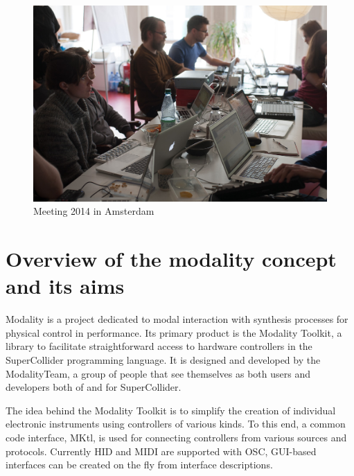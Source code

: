 \documentclass{article}
\title{\papertitle}
\begin{document}
%
\capstartfalse
\maketitle
\capstarttrue
%
\begin{abstract}
	Modality is a toolkit to improve and facilitate the use of digital technology within sound art and music, based on the audio programming language SuperCollider.
\end{abstract}

\begin{figure}[h]
	\centering
		\includegraphics[width=.9\columnwidth]{../media/20140331-IMG_5976.jpg}
	\caption{Meeting 2014 in Amsterdam}
	\label{fig:media_20140331-IMG_5976}
\end{figure}

\section{Overview of the modality concept and its aims}
\label{sec:overview_of_modality_concept_and_aims}


Modality is a project dedicated to modal interaction with synthesis processes for physical control in performance. Its primary product is the Modality Toolkit, a library to facilitate straightforward access to hardware controllers in the SuperCollider programming language. It is designed and developed by the ModalityTeam, a group of people that see themselves as both users and developers both of and for SuperCollider.

The idea behind the Modality Toolkit is to simplify the creation of individual electronic instruments using controllers of various kinds. 
To this end, a common code interface, MKtl, is used for connecting controllers from various sources and protocols. 
Currently HID and MIDI are supported with OSC, GUI-based interfaces can be created on the fly from interface descriptions.
\end{document}
